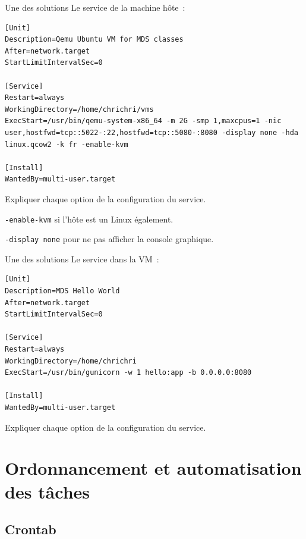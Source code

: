 \documentclass{beamer}
\begin{document}
    \begin{frame}[fragile]{Une des solutions}
        Le service de la machine hôte~:
        \begin{lstlisting}
[Unit]
Description=Qemu Ubuntu VM for MDS classes
After=network.target
StartLimitIntervalSec=0

[Service]
Restart=always
WorkingDirectory=/home/chrichri/vms
ExecStart=/usr/bin/qemu-system-x86_64 -m 2G -smp 1,maxcpus=1 -nic user,hostfwd=tcp::5022-:22,hostfwd=tcp::5080-:8080 -display none -hda linux.qcow2 -k fr -enable-kvm

[Install]
WantedBy=multi-user.target
        \end{lstlisting}
        Expliquer chaque option de la configuration du service.
        \pause
        \begin{dangercolorbox}
            \lstinline{-enable-kvm} si l'hôte est un Linux également.

            \lstinline{-display none} pour ne pas afficher la console graphique.
        \end{dangercolorbox}
    \end{frame}

    \begin{frame}[fragile]{Une des solutions}
        Le service dans la VM~:
        \begin{lstlisting}
[Unit]
Description=MDS Hello World
After=network.target
StartLimitIntervalSec=0

[Service]
Restart=always
WorkingDirectory=/home/chrichri
ExecStart=/usr/bin/gunicorn -w 1 hello:app -b 0.0.0.0:8080

[Install]
WantedBy=multi-user.target
        \end{lstlisting}
        Expliquer chaque option de la configuration du service.
    \end{frame}


    \section{Ordonnancement et automatisation des tâches}\label{sec:scheduling}

    \subsection{Crontab}\label{subsec:crontab}
\end{document}
